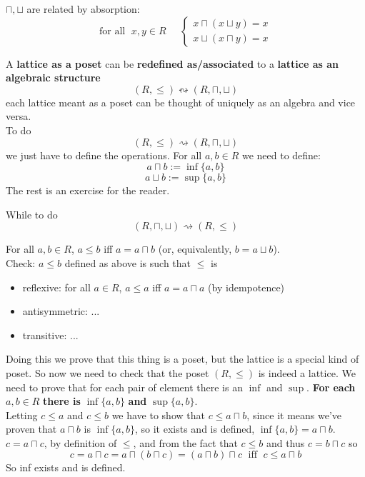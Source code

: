 \documentclass[11pt]{article}
\begin{document}
	$\sqcap, \sqcup$ are related by absorption:
	$$
	\text{for all }\; x, y \in R \;\;\;\;\;
	\begin{cases}
		x \sqcap (x \sqcup y) = x \\
		x \sqcup (x \sqcap y) = x
	\end{cases}$$
	
	A \textbf{lattice as a poset} can be \textbf{redefined as/associated} to a \textbf{lattice as an algebraic structure}
	$$ (R, \leq ) \leftrightsquigarrow (R, \sqcap, \sqcup)$$
	each lattice meant as a poset can be thought of uniquely as an algebra and vice versa.\\
	
	To do 
	$$ (R, \leq ) \rightsquigarrow (R, \sqcap, \sqcup) $$
	we just have to define the operations. For all $a,b \in R$ we need to define:
	$$ a \sqcap b := \inf \{a, b\}$$
	$$ a \sqcup b := \sup \{a,b\}$$
	The rest is an exercise for the reader.\\
	
	\newpage
	
	While to do
	$$ (R, \sqcap, \sqcup ) \rightsquigarrow (R, \leq) $$
	
	For all $a,b \in R$, $a \leq b$ iff $a = a\sqcap b$ (or, equivalently, $b = a \sqcup b$).\\
	
	Check: $a \leq b$ defined as above is such that $\leq$ is 
	\begin{itemize}
		\item reflexive: for all $a \in R$, $a \leq a$ iff $a = a \sqcap a$ (by idempotence)
		\item antisymmetric: ...
		\item transitive: ...
	\end{itemize}
	
	Doing this we prove that this thing is a poset, but the lattice is a special kind of poset. So now we need to check that the poset $(R, \leq)$ is indeed a lattice. We need to prove that for each pair of element there is an $\inf$ and $\sup$. \textbf{For each} $a,b \in R$ \textbf{there is} $\inf\{a,b\}$ \textbf{and} $\sup \{a,b\}$.\\
	
	Letting $c \leq a$ and $c \leq b$ we have to show that $c \leq a \sqcap b$, since it means we've proven that $a \sqcap b$ is $\inf\{a,b\}$, so it exists and is defined, $\inf\{a,b\} = a \sqcap b$.\\
	
	$c = a \sqcap c$, by definition of $\leq$, and from the fact that $c \leq b$ and thus $c = b \sqcap c$ so 
	$$ c = a \sqcap c = a \sqcap (b \sqcap c) = (a \sqcap b) \sqcap c \; \text{ iff } \; c \leq a \sqcap b$$
	So inf exists and is defined.\\
	
\end{document}
